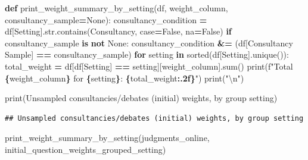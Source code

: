 \documentclass[
]{article}
\newenvironment{Shaded}{\begin{snugshade}}{\end{snugshade}}
\newcommand{\BuiltInTok}[1]{#1}
\newcommand{\CharTok}[1]{\textcolor[rgb]{0.31,0.60,0.02}{#1}}
\newcommand{\ControlFlowTok}[1]{\textcolor[rgb]{0.13,0.29,0.53}{\textbf{#1}}}
\newcommand{\KeywordTok}[1]{\textcolor[rgb]{0.13,0.29,0.53}{\textbf{#1}}}
\newcommand{\NormalTok}[1]{#1}
\newcommand{\OperatorTok}[1]{\textcolor[rgb]{0.81,0.36,0.00}{\textbf{#1}}}
\newcommand{\SpecialCharTok}[1]{\textcolor[rgb]{0.81,0.36,0.00}{\textbf{#1}}}
\newcommand{\SpecialStringTok}[1]{\textcolor[rgb]{0.31,0.60,0.02}{#1}}
\newcommand{\StringTok}[1]{\textcolor[rgb]{0.31,0.60,0.02}{#1}}
\newcommand{\VariableTok}[1]{\textcolor[rgb]{0.00,0.00,0.00}{#1}}
\begin{document}
\begin{Shaded}
\begin{Highlighting}[]
\KeywordTok{def}\NormalTok{ print\_weight\_summary\_by\_setting(df, weight\_column, consultancy\_sample}\OperatorTok{=}\VariableTok{None}\NormalTok{):}
\NormalTok{    consultancy\_condition }\OperatorTok{=}\NormalTok{ df[}\StringTok{\textquotesingle{}Setting\textquotesingle{}}\NormalTok{].}\BuiltInTok{str}\NormalTok{.contains(}\StringTok{\textquotesingle{}Consultancy\textquotesingle{}}\NormalTok{, case}\OperatorTok{=}\VariableTok{False}\NormalTok{, na}\OperatorTok{=}\VariableTok{False}\NormalTok{)}
    \ControlFlowTok{if}\NormalTok{ consultancy\_sample }\KeywordTok{is} \KeywordTok{not} \VariableTok{None}\NormalTok{:}
\NormalTok{        consultancy\_condition }\OperatorTok{\&=}\NormalTok{ (df[}\StringTok{\textquotesingle{}Consultancy Sample\textquotesingle{}}\NormalTok{] }\OperatorTok{==}\NormalTok{ consultancy\_sample)}
    \ControlFlowTok{for}\NormalTok{ setting }\KeywordTok{in} \BuiltInTok{sorted}\NormalTok{(df[}\StringTok{\textquotesingle{}Setting\textquotesingle{}}\NormalTok{].unique()):}
\NormalTok{        total\_weight }\OperatorTok{=}\NormalTok{ df[df[}\StringTok{\textquotesingle{}Setting\textquotesingle{}}\NormalTok{] }\OperatorTok{==}\NormalTok{ setting][weight\_column].}\BuiltInTok{sum}\NormalTok{()}
        \BuiltInTok{print}\NormalTok{(}\SpecialStringTok{f"Total }\SpecialCharTok{\{}\NormalTok{weight\_column}\SpecialCharTok{\}}\SpecialStringTok{ for }\SpecialCharTok{\{}\NormalTok{setting}\SpecialCharTok{\}}\SpecialStringTok{: }\SpecialCharTok{\{}\NormalTok{total\_weight}\SpecialCharTok{:.2f\}}\SpecialStringTok{"}\NormalTok{)}
    \BuiltInTok{print}\NormalTok{(}\StringTok{"}\CharTok{\textbackslash{}n}\StringTok{"}\NormalTok{)}

\BuiltInTok{print}\NormalTok{(}\StringTok{\textquotesingle{}Unsampled consultancies/debates (initial) weights, by group setting\textquotesingle{}}\NormalTok{)}
\end{Highlighting}
\end{Shaded}

\begin{verbatim}
## Unsampled consultancies/debates (initial) weights, by group setting
\end{verbatim}

\begin{Shaded}
\begin{Highlighting}[]
\NormalTok{print\_weight\_summary\_by\_setting(judgments\_online, }\StringTok{\textquotesingle{}initial\_question\_weights\_grouped\_setting\textquotesingle{}}\NormalTok{)}
\end{Highlighting}
\end{Shaded}
\end{document}
